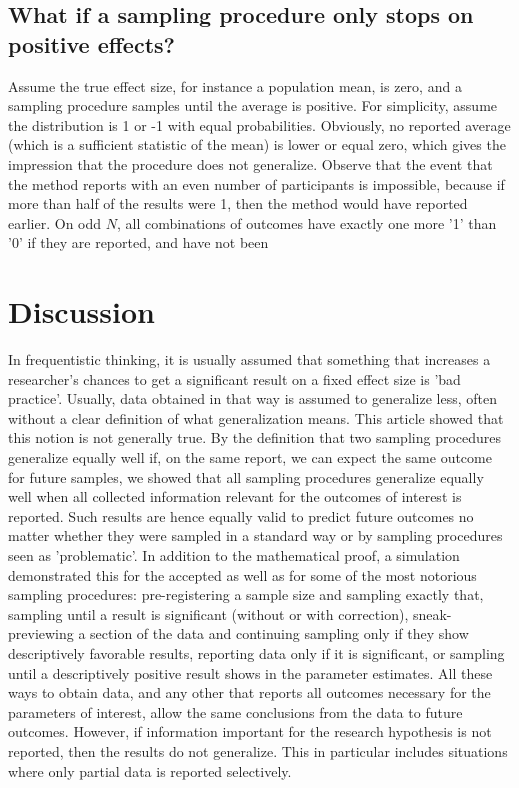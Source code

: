 \documentclass[man]{apa7}
\theoremstyle{definition}
\begin{document}
\subsection{What if a sampling procedure only stops on positive effects?}
Assume the true effect size, for instance a population mean, is zero, and a sampling procedure samples until the average is positive. For simplicity, assume the distribution is 1 or -1 with equal probabilities. Obviously, no reported average (which is a sufficient statistic of the mean) is lower or equal zero, which gives the impression that the procedure does not generalize. Observe that the event that the method reports with an even number of participants is impossible, because if more than half of the results were 1, then the method would have reported earlier. On odd $N$, all combinations of outcomes have exactly one more '1' than '0' if they are reported, and have not been %

\section{Discussion}
In frequentistic thinking, it is usually assumed that something that increases a researcher's chances to get a significant result on a fixed effect size is 'bad practice'. Usually, data obtained in that way is assumed to generalize less, often without a clear definition of what generalization means. This article showed that this notion is not generally true. By the definition that two sampling procedures generalize equally well if, on the same report, we can expect the same outcome for future samples, we showed that all sampling procedures generalize equally well when all collected information relevant for the outcomes of interest is reported. Such results are hence equally valid to predict future outcomes no matter whether they were sampled in a standard way or by sampling procedures seen as 'problematic'. In addition to the mathematical proof, a simulation demonstrated this for the accepted as well as for some of the most notorious sampling procedures: pre-registering a sample size and sampling exactly that, sampling until a result is significant (without or with correction), sneak-previewing a section of the data and continuing sampling only if they show descriptively favorable results, reporting data only if it is significant, or sampling until a descriptively positive result shows in the parameter estimates. All these ways to obtain data, and any other that reports all outcomes necessary for the parameters of interest, allow the same conclusions from the data to future outcomes. However, if information important for the research hypothesis is not reported, then the results do not generalize. This in particular includes situations where only partial data is reported selectively.
\end{document}
